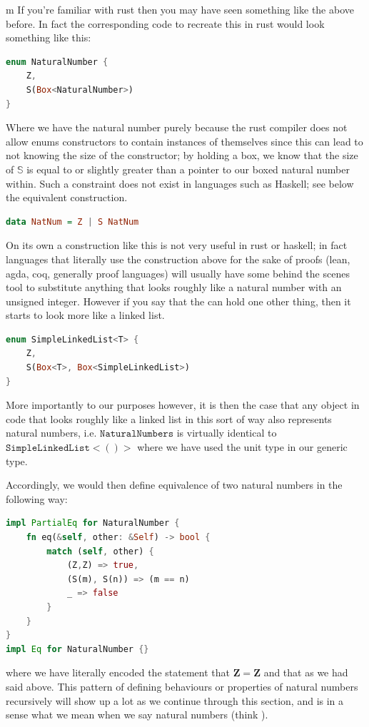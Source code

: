 \documentclass[11pt]{article}
\begin{document}
\begin{my proof}{m}
If you're familiar with rust then you may have seen something like the above before. In fact the corresponding code to recreate this in rust would look something like this:
\begin{lstlisting}[language=Rust]
enum NaturalNumber {
	Z,
	S(Box<NaturalNumber>)
}
\end{lstlisting}

Where we have  the natural number purely because the rust compiler does not allow enums constructors to contain instances of themselves since this can lead to not knowing the size of the constructor; by holding a box, we know that the size of $\mathbb{S}$ is equal to or slightly greater than a pointer to our boxed natural number within. Such a constraint does not exist in languages such as Haskell; see below the equivalent construction.

\begin{lstlisting}[language=Haskell]
data NatNum = Z | S NatNum
\end{lstlisting}

On its own a construction like this is not very useful in rust or haskell; in fact languages that literally use the construction above for the sake of proofs (lean, agda, coq, generally proof languages) will usually have some behind the scenes tool to substitute anything that looks roughly like a natural number with an unsigned integer. However if you say that the  can hold one other thing, then it starts to look more like a linked list.

\begin{lstlisting}[language=Rust]
enum SimpleLinkedList<T> {
	Z,
	S(Box<T>, Box<SimpleLinkedList>)
}
\end{lstlisting}

More importantly to our purposes however, it is then the case that any object in code that looks roughly like a linked list in this sort of way also represents natural numbers, i.e. $\mathtt{NaturalNumbers}$ is virtually identical to $\mathtt{SimpleLinkedList<()>}$ where we have used the unit type in our generic type.

Accordingly, we would then define equivalence of two natural numbers in the following way:
\begin{lstlisting}[language=Rust]
impl PartialEq for NaturalNumber {
	fn eq(&self, other: &Self) -> bool {
		match (self, other) {
			(Z,Z) => true,
			(S(m), S(n)) => (m == n)
			_ => false
		}
	}
}
impl Eq for NaturalNumber {}
\end{lstlisting}

where we have literally encoded the statement that $\mathbf{Z} = \mathbf{Z}$ and that  as we had said above. This pattern of defining behaviours or properties of natural numbers recursively will show up a lot as we continue through this section, and is in a sense what we mean when we say  natural numbers (think ).

\end{my proof}
\end{document}
